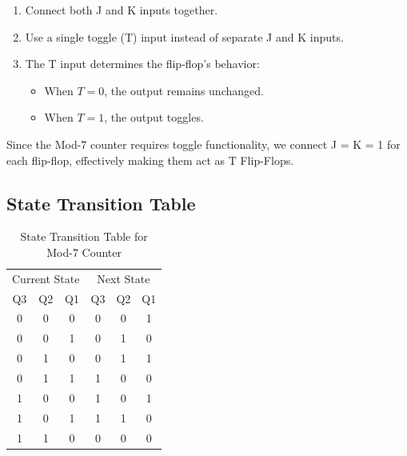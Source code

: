 \documentclass[a4paper,12pt]{article}
\begin{document}
\begin{enumerate}
    \item Connect both J and K inputs together.
    \item Use a single toggle (T) input instead of separate J and K inputs.
    \item The T input determines the flip-flop's behavior:
          \begin{itemize}
              \item When \( T = 0 \), the output remains unchanged.
              \item When \( T = 1 \), the output toggles.
          \end{itemize}
\end{enumerate}
Since the Mod-7 counter requires toggle functionality, we connect J = K = 1 for each flip-flop, effectively making them act as T Flip-Flops.

\subsection{State Transition Table}
\begin{table}[H]
    \centering
    \begin{tabular}{c c c | c c c}
        \toprule
        \multicolumn{3}{c|}{Current State} & \multicolumn{3}{c}{Next State} \\
        Q3 & Q2 & Q1 & Q3 & Q2 & Q1 \\
        \midrule
        0 & 0 & 0 & 0 & 0 & 1 \\
        0 & 0 & 1 & 0 & 1 & 0 \\
        0 & 1 & 0 & 0 & 1 & 1 \\
        0 & 1 & 1 & 1 & 0 & 0 \\
        1 & 0 & 0 & 1 & 0 & 1 \\
        1 & 0 & 1 & 1 & 1 & 0 \\
        1 & 1 & 0 & 0 & 0 & 0 \\
        \bottomrule
    \end{tabular}
    \caption{State Transition Table for Mod-7 Counter}
\end{table}
\newpage
\end{document}
